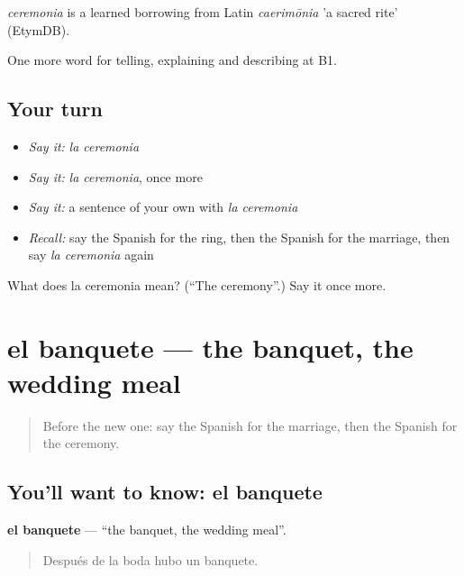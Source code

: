 \begin{cousinweb}
\emph{ceremonia} is a learned borrowing from Latin \emph{caerimōnia} 'a sacred rite' (EtymDB).
\end{cousinweb}

\begin{grammarlens}[title={What you've built}]
One more word for telling, explaining and describing at B1.
\end{grammarlens}

\subsection*{Your turn}
\begin{itemize}
\raggedright
  \item \emph{Say it:} \emph{la ceremonia}
  \item \emph{Say it:} \emph{la ceremonia}, once more
  \item \emph{Say it:} a sentence of your own with \emph{la ceremonia}
  \item \emph{Recall:} say the Spanish for the ring, then the Spanish for the marriage, then say \emph{la ceremonia} again
\end{itemize}

\begin{tcolorbox}[breakable,colback=teal!4,colframe=teal!35!black,title={Before you move on}]
What does la ceremonia mean? (\textquotedblleft{}The ceremony\textquotedblright{}.) Say it once more.
\end{tcolorbox}
\section[el banquete]{el banquete — the banquet, the wedding meal}

\label{lesson:ES-C548-banquete}



\begin{quote}
Before the new one: say the Spanish for the marriage, then the Spanish for the ceremony.
\end{quote}

\subsection*{You'll want to know: el banquete}
\textbf{el banquete} — \textquotedblleft{}the banquet, the wedding meal\textquotedblright{}.

\begin{quote}
Después de la boda hubo un banquete.
\end{quote}


